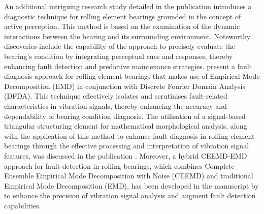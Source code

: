 \documentclass[sn-basic,pdflatex]{sn-jnl}
\theoremstyle{remark}
\theoremstyle{definition}
\begin{document}
An additional intriguing research study detailed in the publication
\citet{WOS:000360994300029} introduces a diagnostic technique for
rolling element bearings grounded in the concept of active perception.
This method is based on the examination of the dynamic interactions
between the bearing and its surrounding environment. Noteworthy
discoveries include the capability of the approach to precisely evaluate
the bearing's condition by integrating perceptual cues and responses,
thereby enhancing fault detection and predictive maintenance strategies.
\citet{WOS:000343577703075} present a fault diagnosis approach for
rolling element bearings that makes use of Empirical Mode Decomposition
(EMD) in conjunction with Discrete Fourier Domain Analysis (DFDA). This
technique effectively isolates and scrutinises fault-related
characteristics in vibration signals, thereby enhancing the accuracy and
dependability of bearing condition diagnosis. The utilisation of a
signal-based triangular structuring element for mathematical
morphological analysis, along with the application of this method to
enhance fault diagnosis in rolling element bearings through the
effective processing and interpretation of vibration signal features,
was discussed in the publication \citep{WOS:000334316700001}. Moreover,
a hybrid CEEMD-EMD approach for fault detection in rolling bearings,
which combines Complete Ensemble Empirical Mode Decomposition with Noise
(CEEMD) and traditional Empirical Mode Decomposition (EMD), has been
developed in the manuscript by \citet{WOS:000412752200052} to enhance
the precision of vibration signal analysis and augment fault detection
capabilities.
\end{document}
